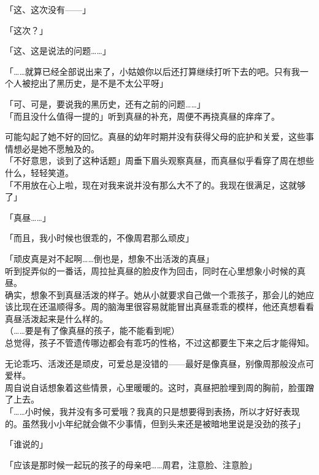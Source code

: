 「这、这次没有——」

「这次？」

「这、这是说法的问题……」

「……就算已经全部说出来了，小姑娘你以后还打算继续打听下去的吧。只有我一个人被挖出了黑历史，是不是不太公平呀」

「可、可是，要说我的黑历史，还有之前的问题……」\\

「而且没什么值得一提的」听到真昼的补充，周便不再挠真昼的痒痒了。

可能勾起了她不好的回忆。真昼的幼年时期并没有获得父母的庇护和关爱，这些事情想必是她不愿触及的。\\

「不好意思，谈到了这种话题」周垂下眉头观察真昼，而真昼似乎看穿了周在想些什么，轻轻笑道。\\

「不用放在心上啦，现在对我来说并没有那么大不了的。我现在很满足，这就够了」

「真昼……」

「而且，我小时候也很乖的，不像周君那么顽皮」

「顽皮真是对不起啊……倒也是，想象不出活泼的真昼」\\

听到捉弄似的一番话，周拉扯真昼的脸皮作为回击，同时在心里想象小时候的真昼。\\

确实，想象不到真昼活泼的样子。她从小就要求自己做一个乖孩子，那会儿的她应该比现在还温顺得多。周的脑海里很容易就能冒出真昼乖乖的模样，他还真想看看真昼活泼起来是什么样的。\\

（……要是有了像真昼的孩子，能不能看到呢）\\

总觉得，孩子不管遗传哪边都会有乖巧的性格，不过这都要生下来之后才能得知。

无论乖巧、活泼还是顽皮，可爱总是没错的——最好是像真昼，别像周那般没点可爱样。\\

周自说自话想象着这些情景，心里暖暖的。这时，真昼把脸埋到周的胸前，脸蛋蹭了上去。\\

「……小时候，我并没有多可爱哦？我真的只是想要得到表扬，所以才好好表现的。虽然我小小年纪就会做不少事情，但到头来还是被暗地里说是没劲的孩子」

「谁说的」

「应该是那时候一起玩的孩子的母亲吧……周君，注意脸、注意脸」

